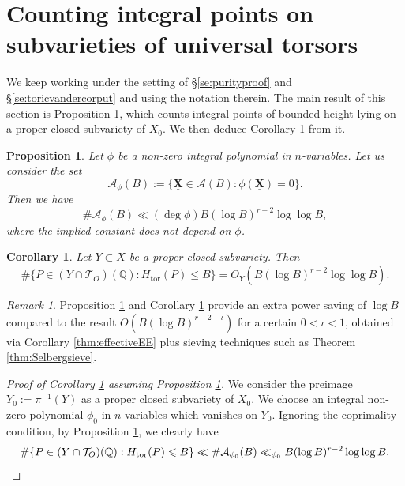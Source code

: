 \documentclass[11pt,letterpaper]{amsart}
\newcommand{\BQ}{{\mathbb {Q}}}
\newcommand{\CA}{{\mathcal {A}}}
\newcommand{\CT}{{\mathcal {T}}}
\newcommand{\XX}{\underline{\mathbf{X}}}
\theoremstyle{plain}
\numberwithin{equation}{section}
\newtheorem{proposition}[theorem]{Proposition}
\newtheorem{corollary}[theorem]{Corollary}
\theoremstyle{definition}
\theoremstyle{remark}
\newtheorem{remark}[theorem]{Remark}
\begin{document}
\section{Counting integral points on subvarieties of universal torsors}\label{se:countingsubvar}
We keep working under the setting of \S\ref{se:purityproof} and \S\ref{se:toricvandercorput} and using the notation therein. The main result of this section is Proposition \ref{prop:subvar}, which counts integral points of bounded height lying on a proper closed subvariety of $X_0$. We then deduce Corollary \ref{cor:subvar} from it.
\begin{proposition}\label{prop:subvar}
	Let $\phi$ be a non-zero integral polynomial in $n$-variables. Let us consider the set 
\begin{equation}\label{eq:CAphi}
		\CA_{\phi}(B):=\{\XX\in\CA(B):\phi(\XX)=0\}.
\end{equation}
	Then we have
	$$\#\CA_{\phi}(B)\ll (\deg \phi) B(\log B)^{r-2}\log\log B,$$ where the implied constant does not depend on $\phi$.
\end{proposition}
\begin{corollary}\label{cor:subvar}
	Let $Y\subset X$ be a proper closed subvariety.
	Then $$\#\{P\in (Y\cap \CT_{O})(\BQ):H_{\operatorname{tor}}(P)\leqslant B\}=O_Y(B(\log B)^{r-2}\log\log B).$$
\end{corollary}
\begin{remark}
	Proposition \ref{prop:subvar} and Corollary \ref{cor:subvar} provide an extra power saving of $\log B$ compared to the result $O(B(\log B)^{r-2+\iota})$ for a certain $0<\iota<1$, obtained via Corollary \ref{thm:effectiveEE} plus sieving techniques such as Theorem \ref{thm:Selbergsieve}.
\end{remark}
\begin{proof}[Proof of Corollary \ref{cor:subvar} assuming Proposition \ref{prop:subvar}]
	We consider the preimage $Y_0:=\pi^{-1}(Y)$ as a proper closed subvariety of $X_0$.
	We choose an integral non-zero polynomial $\phi_0$ in $n$-variables which vanishes on $Y_0$. 
	Ignoring the coprimality condition, by Proposition \ref{prop:subvar}, we clearly have 
	\begin{equation*}
		\#\{P\in (Y\cap \CT_{O})(\BQ):H_{\operatorname{tor}}(P)\leqslant B\}\ll \#\CA_{\phi_0}(B)\ll_{\phi_0}B(\log B)^{r-2}\log\log B. \qedhere
	\end{equation*} 
\end{proof}
\end{document}
